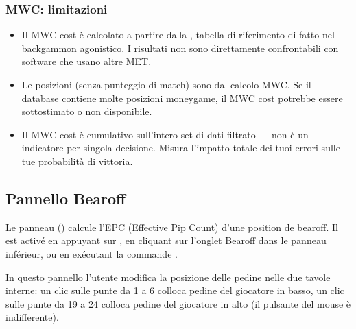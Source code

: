 \documentclass[letterpaper,10pt,italian]{sphinxmanual}
\begin{document}
\subsubsection{MWC: limitazioni}
\label{\detokenize{manuel:mwc-limitations}}\begin{itemize}
\item {} 
\sphinxAtStartPar
Il MWC cost è calcolato a partire dalla , tabella di riferimento di fatto nel backgammon agonistico. I risultati non sono direttamente confrontabili con software che usano altre MET.

\item {} 
\sphinxAtStartPar
Le posizioni  (senza punteggio di match) sono  dal calcolo MWC. Se il database contiene molte posizioni money\sphinxhyphen{}game, il MWC cost potrebbe essere sottostimato o non disponibile.

\item {} 
\sphinxAtStartPar
Il MWC cost è cumulativo sull’intero set di dati filtrato — non è un indicatore per singola decisione. Misura l’impatto totale dei tuoi errori sulle tue probabilità di vittoria.

\end{itemize}


\subsection{Pannello Bearoff}
\label{\detokenize{manuel:panneau-bearoff}}\label{\detokenize{manuel:panneau-epc}}
\sphinxAtStartPar
Le panneau  () calcule l’EPC (Effective Pip Count) d’une
position de bearoff. Il est activé en appuyant sur , en cliquant sur
l’onglet Bearoff dans le panneau inférieur, ou en exécutant la commande
.

\sphinxAtStartPar
In questo pannello l’utente modifica la posizione delle pedine nelle due tavole interne: un clic sulle punte da 1 a 6 colloca pedine del giocatore in basso, un clic sulle punte da 19 a 24 colloca pedine del giocatore in alto (il pulsante del mouse è indifferente).
\end{document}
